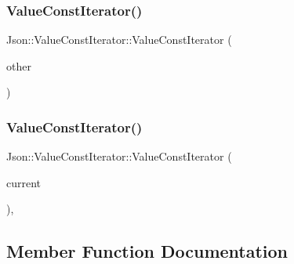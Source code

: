 \hypertarget{class_json_1_1_value_const_iterator_a7ef3df204a9ae83a0d8a3cd128e05c70}{}\label{class_json_1_1_value_const_iterator_a7ef3df204a9ae83a0d8a3cd128e05c70} 
\subsubsection{\texorpdfstring{Value\+Const\+Iterator()}{ValueConstIterator()}\hspace{0.1cm}{\footnotesize\ttfamily [5/6]}}
{\footnotesize\ttfamily Json\+::\+Value\+Const\+Iterator\+::\+Value\+Const\+Iterator (\begin{DoxyParamCaption}\item[{\hyperlink{class_json_1_1_value_iterator}{Value\+Iterator} const \&}]{other }\end{DoxyParamCaption})}

\hypertarget{class_json_1_1_value_const_iterator_aa0a87edf5f1097f91dca5f2a389c4abd}{}\label{class_json_1_1_value_const_iterator_aa0a87edf5f1097f91dca5f2a389c4abd} 
\subsubsection{\texorpdfstring{Value\+Const\+Iterator()}{ValueConstIterator()}\hspace{0.1cm}{\footnotesize\ttfamily [6/6]}}
{\footnotesize\ttfamily Json\+::\+Value\+Const\+Iterator\+::\+Value\+Const\+Iterator (\begin{DoxyParamCaption}\item[{const Value\+::\+Object\+Values\+::iterator \&}]{current }\end{DoxyParamCaption})\hspace{0.3cm}{\ttfamily [explicit]}, {\ttfamily [private]}}



\subsection{Member Function Documentation}
\hypertarget{class_json_1_1_value_const_iterator_ae5612dad47a6387eef71d584fb741d0c}{}\label{class_json_1_1_value_const_iterator_ae5612dad47a6387eef71d584fb741d0c} 
